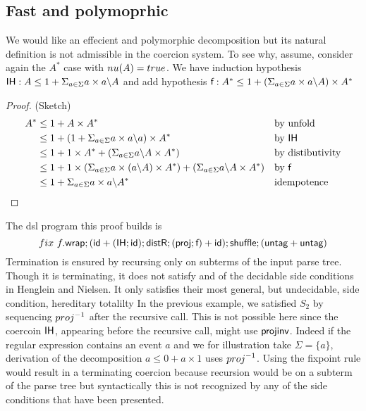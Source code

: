 \documentclass[a4paper,UKenglish,cleveref, autoref, thm-restate]{lipics-v2021}
\newcommand\mycomment[1]{}
\begin{document}
\subsection{Fast and polymoprhic}
We would like an effecient and polymorphic decomposition but its natural definition is not admissible in the coercion system. To see why, assume, consider again the $A^*$ case with $\mynu{A} = \true$. We have induction hypothesis $\textsf{IH} : A \leq 1 + \Sigma_{a \in \Sigma} a\times a \backslash A$ and add hypothesis $\textsf{f} : A^* \leq 1 + (\Sigma_{a \in \Sigma} a\times a \backslash A) \times A^*$
\begin{proof} (Sketch)
\begin{align}
A^* &\leq  1 + A \times A^* && \text{by unfold}\\
 &\leq 1 + (1 + \Sigma_{a \in \Sigma} a\times a \backslash a) \times A^* && \text{by } \textsf{IH}\\
 &\leq 1 + 1 \times A^* + (\Sigma_{a \in \Sigma} a \backslash A \times A^*) && \text{by distibutivity}\\
 &\leq 1 +  1 \times (\Sigma_{a \in \Sigma} a\times (a \backslash A)\times A^*) +  (\Sigma_{a \in \Sigma} a \backslash A \times A^*)  && \text{by } \textsf{f}  \\
 &\leq 1 + \Sigma_{a \in \Sigma} a\times a \backslash A^* && \text{idempotence} 
\end{align}
\end{proof}
The dsl program this proof builds is \mycomment{did not check details}
\[ \fix ~f.\dslcom{wrap};(\dslcom{id} + (\dslcom{IH};\dslcom {id});\dslcom{distR};(\dslcom{proj};\dslcom{f})+\dslcom{id});\dslcom{shuffle};(\dslcom{untag} + \dslcom{untag}) \]
Termination is ensured by recursing only on subterms of the input parse tree. Though it is terminating, it does not satisfy and of the decidable side conditions in Henglein and Nielsen. It only satisfies their most general, but undecidable, side condition, hereditary totalilty
In the previous example, we satisfied $S_2$ by sequencing $\dslcominv{proj}$ after the recursive call. This is not possible here since the coercoin $\textsf{IH}$, appearing before the recursive call, might use $\textsf{projinv}$. Indeed if the regular expression contains an event $a$ and we for illustration take $\Sigma = \{a\}$, derivation of the decomposition $a \leq 0 + a \times 1 $ uses $\dslcominv{proj}$. Using the fixpoint rule would result in a terminating coercion because recursion would be on a subterm of the parse tree but syntactically this is not recognized by any of the side conditions that have been presented.
\end{document}
